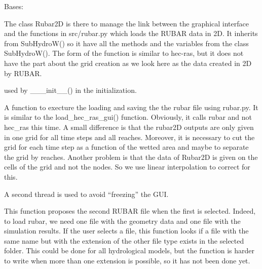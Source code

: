 \documentclass[letterpaper,10pt,english]{sphinxmanual}
\begin{document}
\begin{fulllineitems}
\label{\detokenize{index:src_GUI.hydro_GUI_2.Rubar2D}}
Bases: {\hyperref[\detokenize{index:src_GUI.hydro_GUI_2.SubHydroW}]{}}

The class Rubar2D is there to manage the link between the graphical interface and the functions in src/rubar.py
which loads the RUBAR data in 2D. It inherits from SubHydroW() so it have all the methods and the variables from
the class SubHydroW(). The form of the function is similar to hec-ras, but it does not have the part about the grid
creation as we look here as the data created in 2D by RUBAR.

\begin{fulllineitems}
\label{\detokenize{index:src_GUI.hydro_GUI_2.Rubar2D.init_iu}}
used by \_\_\_init\_\_() in the initialization.

\end{fulllineitems}


\begin{fulllineitems}
\label{\detokenize{index:src_GUI.hydro_GUI_2.Rubar2D.load_rubar}}
A function to execture the loading and saving the the rubar file using rubar.py. It is similar to the
load\_hec\_ras\_gui() function. Obviously, it calls rubar and not hec\_ras this time. A small difference is that
the rubar2D outputs are only given in one grid for all time steps and all reaches. Moreover, it is
necessary to cut the grid for each time step as a function of the wetted area and maybe to separate the
grid by reaches.  Another problem is that the data of Rubar2D is given on the cells of the grid and not the
nodes. So we use linear interpolation to correct for this.

A second thread is used to avoid ``freezing'' the GUI.

\end{fulllineitems}


\begin{fulllineitems}
\label{\detokenize{index:src_GUI.hydro_GUI_2.Rubar2D.propose_next_file}}
This function proposes the second RUBAR file when the first is selected.  Indeed, to load rubar, we need
one file with the geometry data and one file with the simulation results. If the user selects a file, this
function looks if a file with the same name but with the extension of the other file type exists in the
selected folder. This could be done for all hydrological models, but the function is harder
to write when more than one extension is possible, so it has not been done yet.


\end{fulllineitems}
\end{fulllineitems}
\end{document}
